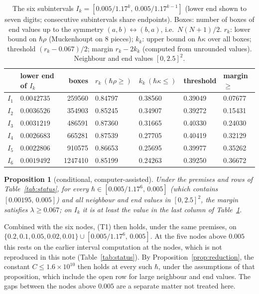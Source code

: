 \documentclass[11pt,a4paper]{article}
\newtheorem{proposition}[theorem]{Proposition}
\theoremstyle{definition}
\theoremstyle{remark}
\newcommand{\hk}{\hbar\kappa}
\newcommand{\hr}{\hbar\rho}
\begin{document}
\begin{table}[!htbp]\centering\small
\caption{The six subintervals $I_k=[0.005/1.17^k,\,0.005/1.17^{k-1}]$ (lower end shown to seven digits; consecutive subintervals share endpoints). Boxes: number of boxes of end values up to the symmetry $(a,b)\leftrightarrow(b,a)$, i.e.\ $N(N+1)/2$. $r_k$: lower bound on $\hr$ (Muckenhoupt on $8$ pieces); $k_k$: upper bound on $\hk$ over all boxes; threshold $(r_k-0.067)/2$; margin $r_k-2k_k$ (computed from unrounded values). Neighbour and end values $[0,2.5]^2$.}\label{tab:results}
\begin{tabular}{@{}llrllll@{}}\toprule
 & lower end of $I_k$ & boxes & $r_k\ (\hr\ge)$ & $k_k\ (\hk\le)$ & threshold & margin $\ge$\\\midrule
$I_1$ & $0.0042735$ & 259560 & 0.84797 & 0.38560 & 0.39049 & 0.07677\\
$I_2$ & $0.0036526$ & 354903 & 0.85245 & 0.34907 & 0.39272 & 0.15431\\
$I_3$ & $0.0031219$ & 486591 & 0.87360 & 0.31665 & 0.40330 & 0.24030\\
$I_4$ & $0.0026683$ & 665281 & 0.87539 & 0.27705 & 0.40419 & 0.32129\\
$I_5$ & $0.0022806$ & 910575 & 0.86653 & 0.25695 & 0.39977 & 0.35262\\
$I_6$ & $0.0019492$ & 1247410 & 0.85199 & 0.24263 & 0.39250 & 0.36672\\\bottomrule
\end{tabular}
\end{table}

\begin{proposition}[conditional, computer-assisted]\label{prop:main}
Under the premises and rows of Table~\ref{tab:status}, for every $\hbar\in[0.005/1.17^6,\,0.005]$ (which contains $[0.00195,\,0.005]$) and all neighbour and end values in $[0,2.5]^2$, the margin satisfies $\lambda\ge0.067$; on $I_k$ it is at least the value in the last column of Table~\ref{tab:results}.
\end{proposition}

Combined with the six nodes, (T1) then holds, under the same premises, on $\{0.2,\allowbreak 0.1,\allowbreak 0.05,\allowbreak 0.02,\allowbreak 0.01\}\cup[0.005/1.17^6,\,0.005]$. At the five nodes above $0.005$ this rests on the earlier interval computation at the nodes, which is not reproduced in this note (Table~\ref{tab:status}). By Proposition~\ref{prop:reduction}, the constant $C\le1.6\times10^{10}$ then holds at every such $\hbar$, under the assumptions of that proposition, which include the open row for large neighbour and end values. The gaps between the nodes above $0.005$ are a separate matter not treated here.
\end{document}
